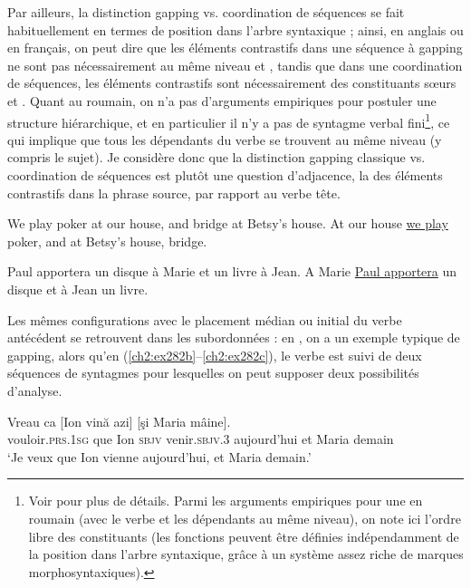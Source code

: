 Par ailleurs, la distinction gapping vs. coordination de séquences se fait habituellement en termes de position dans l’arbre syntaxique ; ainsi, en anglais ou en français, on peut dire que les éléments contrastifs dans une séquence à gapping ne sont pas nécessairement au même niveau  et , tandis que dans une coordination de séquences, les éléments contrastifs sont nécessairement des constituants sœurs  et . Quant au roumain, on n’a pas d’arguments empiriques pour postuler une structure hiérarchique, et en particulier il n’y a pas de syntagme verbal fini\footnote{
 Voir \citet{Bilbiie2011} pour plus de détails. Parmi les arguments empiriques pour une  en roumain (avec le verbe et les dépendants au même niveau), on note ici l’ordre libre des constituants (les fonctions peuvent être définies indépendamment de la position dans l’arbre syntaxique, grâce à un système assez riche de marques morphosyntaxiques).}, ce qui implique que tous les dépendants du verbe se trouvent au même niveau (y compris le sujet). Je considère donc que la distinction gapping classique vs. coordination de séquences est plutôt une question d’adjacence, {\cad} la  des éléments contrastifs dans la phrase source, par rapport au verbe tête.

\ea \label{ch2:ex280}
\ea We play poker at our house, and bridge at Betsy’s house. \label{ch2:ex280a} 
\ex At our house \uline{we play} poker, and at Betsy’s house, bridge. \label{ch2:ex280b} 
\z
\z

\ea \label{ch2:ex281}
\ea Paul apportera un disque à Marie et un livre à Jean. \label{ch2:ex281a} 
\ex A Marie \uline{Paul apportera} un disque et à Jean un livre. \label{ch2:ex281b} 
\z
\z

Les mêmes configurations avec le placement médian ou initial du verbe antécédent se retrouvent dans les subordonnées : en , on a un exemple typique de gapping, alors qu’en (\ref{ch2:ex282b}--\ref{ch2:ex282c}), le verbe est suivi de deux séquences de syntagmes pour lesquelles on peut supposer deux possibilités d’analyse.

\ea \label{ch2:ex282}
\ea 
\gll Vreau  ca  [Ion    vină  azi]  [şi  Maria  mâine]. \label{ch2:ex282a}\\
vouloir.\textsc{prs.1sg}  que  Ion  \textsc{sbjv}  venir.\textsc{sbjv.3}  aujourd’hui  et  Maria  demain\\
\glt ‘Je veux que Ion vienne aujourd’hui, et Maria demain.’


